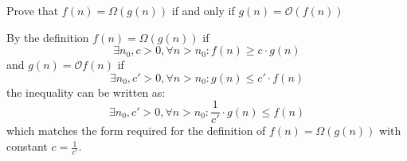 Prove that $f(n) = \Omega(g(n))$ if and only if $g(n) = \mathcal{O}(f(n))$

\begin{customsolutionbox}
    By the definition $f(n) = \Omega (g(n))$ if \[\exists n_0, c > 0, \forall n > n_0 : f(n) \geq c \cdot g(n)\] 
    and $g(n) = \mathcal{O}f(n)$ if 
    \[\exists n_0, c' > 0, \forall n > n_0: g(n) \leq c' \cdot f(n)\] the inequality can be written as: 
    \[\exists n_0, c' > 0, \forall n > n_0: \frac{1}{c'} \cdot g(n) \leq f(n)\]
    which matches the form required for the definition of $f(n) = \Omega(g(n))$ with constant \(c = \frac{1}{c'}\).
\end{customsolutionbox}